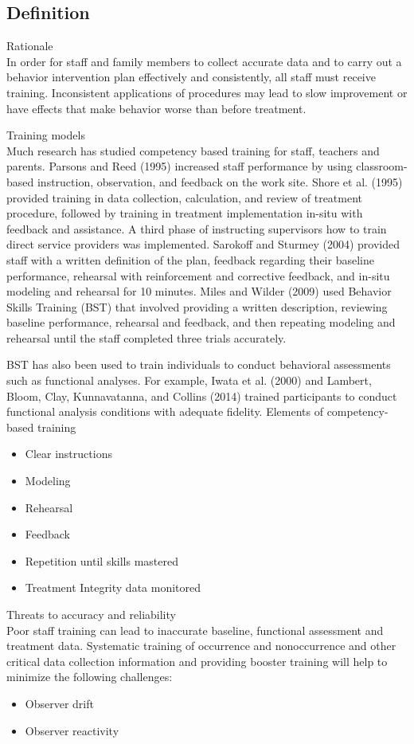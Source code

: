 \subsection{Definition}
Rationale\\
In order for staff and family members to collect accurate data and to carry out a behavior intervention plan effectively and consistently, all staff must receive training.  Inconsistent applications of procedures may lead to slow improvement or have effects that make behavior worse than before treatment.  

Training models\\
Much research has studied competency based training for staff, teachers and parents. Parsons and Reed (1995) increased staff performance by using classroom-based instruction, observation, and feedback on the work site.  Shore et al. (1995) provided training in data collection, calculation, and review of treatment procedure, followed by training in treatment implementation in-situ with feedback and assistance.  A third phase of instructing supervisors how to train direct service providers was implemented.  Sarokoff and Sturmey (2004) provided staff with a written definition of the plan, feedback regarding their baseline performance, rehearsal with reinforcement and corrective feedback, and in-situ modeling and rehearsal for 10 minutes.  Miles and Wilder (2009) used Behavior Skills Training (BST) that involved providing a written description, reviewing baseline performance, rehearsal and feedback, and then repeating modeling and rehearsal until the staff completed three trials accurately.

BST has also been used to train individuals to conduct behavioral assessments such as functional analyses. For example, Iwata et al. (2000) and Lambert, Bloom, Clay, Kunnavatanna, and Collins (2014) trained participants to conduct functional analysis conditions with adequate fidelity. 
%
Elements of competency-based training
\begin{itemize}
\item Clear instructions
\item Modeling
\item Rehearsal
\item Feedback 
\item Repetition until skills mastered
\item Treatment Integrity data monitored
\end{itemize}
%
Threats to accuracy and reliability\\
Poor staff training can lead to inaccurate baseline, functional assessment and treatment data.  Systematic training of occurrence and nonoccurrence and other critical data collection information and providing booster training will help to minimize the following challenges:
\begin{itemize}
\item Observer drift
\item Observer reactivity
\end{itemize}
%
